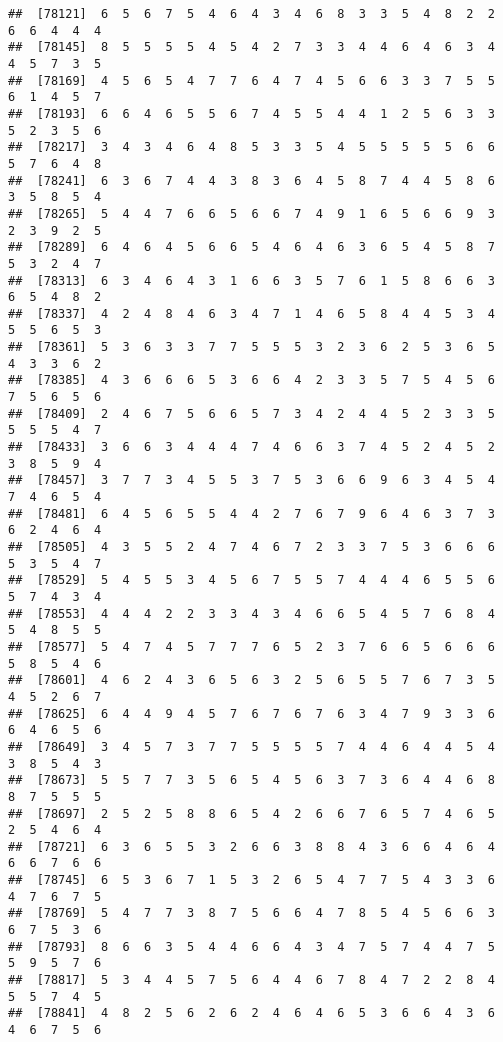 \documentclass[
]{book}
\begin{document}
\begin{verbatim}
##  [78121]  6  5  6  7  5  4  6  4  3  4  6  8  3  3  5  4  8  2  2  6  6  4  4  4
##  [78145]  8  5  5  5  5  4  5  4  2  7  3  3  4  4  6  4  6  3  4  4  5  7  3  5
##  [78169]  4  5  6  5  4  7  7  6  4  7  4  5  6  6  3  3  7  5  5  6  1  4  5  7
##  [78193]  6  6  4  6  5  5  6  7  4  5  5  4  4  1  2  5  6  3  3  5  2  3  5  6
##  [78217]  3  4  3  4  6  4  8  5  3  3  5  4  5  5  5  5  5  6  6  5  7  6  4  8
##  [78241]  6  3  6  7  4  4  3  8  3  6  4  5  8  7  4  4  5  8  6  3  5  8  5  4
##  [78265]  5  4  4  7  6  6  5  6  6  7  4  9  1  6  5  6  6  9  3  2  3  9  2  5
##  [78289]  6  4  6  4  5  6  6  5  4  6  4  6  3  6  5  4  5  8  7  5  3  2  4  7
##  [78313]  6  3  4  6  4  3  1  6  6  3  5  7  6  1  5  8  6  6  3  6  5  4  8  2
##  [78337]  4  2  4  8  4  6  3  4  7  1  4  6  5  8  4  4  5  3  4  5  5  6  5  3
##  [78361]  5  3  6  3  3  7  7  5  5  5  3  2  3  6  2  5  3  6  5  4  3  3  6  2
##  [78385]  4  3  6  6  6  5  3  6  6  4  2  3  3  5  7  5  4  5  6  7  5  6  5  6
##  [78409]  2  4  6  7  5  6  6  5  7  3  4  2  4  4  5  2  3  3  5  5  5  5  4  7
##  [78433]  3  6  6  3  4  4  4  7  4  6  6  3  7  4  5  2  4  5  2  3  8  5  9  4
##  [78457]  3  7  7  3  4  5  5  3  7  5  3  6  6  9  6  3  4  5  4  7  4  6  5  4
##  [78481]  6  4  5  6  5  5  4  4  2  7  6  7  9  6  4  6  3  7  3  6  2  4  6  4
##  [78505]  4  3  5  5  2  4  7  4  6  7  2  3  3  7  5  3  6  6  6  5  3  5  4  7
##  [78529]  5  4  5  5  3  4  5  6  7  5  5  7  4  4  4  6  5  5  6  5  7  4  3  4
##  [78553]  4  4  4  2  2  3  3  4  3  4  6  6  5  4  5  7  6  8  4  5  4  8  5  5
##  [78577]  5  4  7  4  5  7  7  7  6  5  2  3  7  6  6  5  6  6  6  5  8  5  4  6
##  [78601]  4  6  2  4  3  6  5  6  3  2  5  6  5  5  7  6  7  3  5  4  5  2  6  7
##  [78625]  6  4  4  9  4  5  7  6  7  6  7  6  3  4  7  9  3  3  6  6  4  6  5  6
##  [78649]  3  4  5  7  3  7  7  5  5  5  5  7  4  4  6  4  4  5  4  3  8  5  4  3
##  [78673]  5  5  7  7  3  5  6  5  4  5  6  3  7  3  6  4  4  6  8  8  7  5  5  5
##  [78697]  2  5  2  5  8  8  6  5  4  2  6  6  7  6  5  7  4  6  5  2  5  4  6  4
##  [78721]  6  3  6  5  5  3  2  6  6  3  8  8  4  3  6  6  4  6  4  6  6  7  6  6
##  [78745]  6  5  3  6  7  1  5  3  2  6  5  4  7  7  5  4  3  3  6  4  7  6  7  5
##  [78769]  5  4  7  7  3  8  7  5  6  6  4  7  8  5  4  5  6  6  3  6  7  5  3  6
##  [78793]  8  6  6  3  5  4  4  6  6  4  3  4  7  5  7  4  4  7  5  5  9  5  7  6
##  [78817]  5  3  4  4  5  7  5  6  4  4  6  7  8  4  7  2  2  8  4  5  5  7  4  5
##  [78841]  4  8  2  5  6  2  6  2  4  6  4  6  5  3  6  6  4  3  6  4  6  7  5  6

\end{verbatim}
\end{document}
